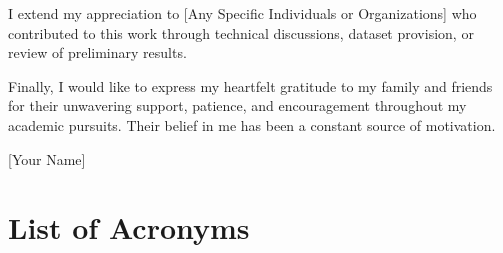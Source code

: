 \documentclass[12pt,a4paper,twoside]{report}
\theoremstyle{mytheoremstyle}
\begin{document}
I extend my appreciation to [Any Specific Individuals or Organizations] who contributed to this work through technical discussions, dataset provision, or review of preliminary results.

Finally, I would like to express my heartfelt gratitude to my family and friends for their unwavering support, patience, and encouragement throughout my academic pursuits. Their belief in me has been a constant source of motivation.

[Your Name]\\
[Date]

\chapter*{List of Acronyms}

\begin{acronym}[DBSCAN] %
\end{acronym}

\tableofcontents
\listoffigures
\listoftables

\mainmatter






\backmatter


\appendix

\end{document}

